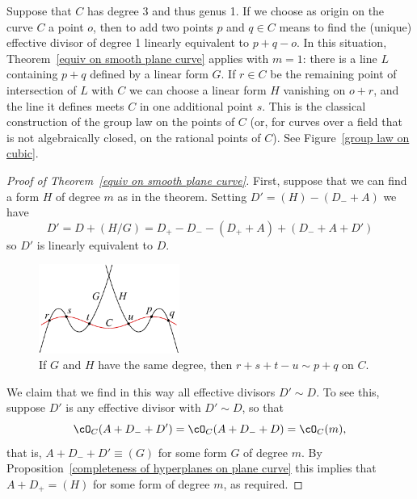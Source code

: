 \begin{example}
Suppose that $C$ has degree 3 and thus genus 1. If we choose as origin on the curve $C$ a point $o$, then to add two points $p$ and $q \in C$ means to find the (unique) effective divisor of degree 1 linearly equivalent to $p + q - o$. In this situation, Theorem~\ref{equiv on smooth plane curve} applies with $m=1$: there is a line $L$
containing $p+q$ defined by a linear form $G$. If $r \in C$ be the remaining point of intersection of $L$ with $C$ we can choose a linear form $H$ vanishing on $o+r$, and the line it defines meets $C$
in one additional point $s$. This is the classical construction of the
%
group law
on the points of $C$ (or,
for curves over a field that is not algebraically closed, on the rational points of $C$).
See Figure~\ref{group law on cubic}.
\end{example}

\begin{proof}[Proof of Theorem~\ref{equiv on smooth plane curve}]
First, suppose that we can find a form $H$ of degree $m$ as in the theorem.
Setting $D' = (H) -(D_{-}+A)$ we have
$$
D' = D + (H/G) = D_{+}- D_{-} - (D_{+}+A)+(D_{-}+A+D')
$$
so $D'$ is linearly equivalent to $D$.

\begin{figure}
\centerline{\includegraphics[height=1.15in]{"main/Fig14-1"}}
\nointerlineskip
\vskip-15pt
\centerline{\color{white} \vrule width 100pt height 12pt}
\vskip-3pt
\caption{If $G$ and $H$ have the same degree, then $r+s+t-u\sim p+q$ on $C$.}
\label{Fig14.3}
\end{figure}

We claim that we find in this way all effective divisors $D' \sim D$.
To see this, suppose $D'$ is any effective divisor with $D' \sim D$, so that
$$
\cO_C(A+D_{-}+D') = \cO_C(A+D_{-}+D)  = \cO_C(m),
$$
that is, $A+D_{-}+D' \equiv (G)$ for some form $G$ of degree $m$. By Proposition~\ref{completeness of hyperplanes on plane curve}
this implies that $A+D_{+} = (H)$ for some form of degree $m$, as required.
\end{proof}



